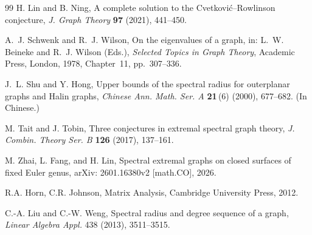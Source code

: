 \documentclass[11pt]{article}
\theoremstyle{plain}
\theoremstyle{definition}
\numberwithin{equation}{section}
\begin{document}
\begin{thebibliography}{99}
H. Lin and B. Ning,
\newblock A complete solution to the Cvetkovi\'c--Rowlinson conjecture,
\newblock \emph{J. Graph Theory} \textbf{97} (2021), 441--450.


A.~J. Schwenk and R.~J. Wilson,
\newblock On the eigenvalues of a graph,
\newblock in: L.~W. Beineke and R.~J. Wilson (Eds.),
\emph{Selected Topics in Graph Theory},
Academic Press, London, 1978, Chapter~11, pp.~307--336.

J.~L. Shu and Y. Hong,
\newblock Upper bounds of the spectral radius for outerplanar graphs
and Halin graphs,
\newblock \emph{Chinese Ann. Math. Ser. A} \textbf{21}\,(6) (2000), 677--682.
\newblock (In Chinese.)

M. Tait and J. Tobin,
\newblock Three conjectures in extremal spectral graph theory,
\newblock \emph{J. Combin. Theory Ser. B} \textbf{126} (2017), 137--161.

M. Zhai, L. Fang, and H. Lin,
\newblock Spectral extremal graphs on closed surfaces of fixed Euler genus,
\newblock arXiv: 2601.16380v2 [math.CO], 2026.

 R.A. Horn, C.R. Johnson, Matrix Analysis, Cambridge University Press, 2012.

C.-A. Liu and C.-W. Weng,
Spectral radius and degree sequence of a graph,
\emph{Linear Algebra Appl.} 438 (2013), 3511--3515.

\end{thebibliography}
\end{document}
